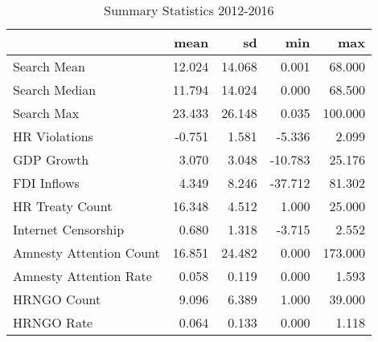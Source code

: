 \begin{table}[ht]
\centering
\begin{tabular}{|l|rrrr|}
  \hline
 & mean & sd & min & max \\ 
  \hline
Search Mean & 12.024 & 14.068 & 0.001 & 68.000 \\ 
  Search Median & 11.794 & 14.024 & 0.000 & 68.500 \\ 
  Search Max & 23.433 & 26.148 & 0.035 & 100.000 \\ 
  HR Violations & -0.751 & 1.581 & -5.336 & 2.099 \\ 
  GDP Growth & 3.070 & 3.048 & -10.783 & 25.176 \\ 
  FDI Inflows & 4.349 & 8.246 & -37.712 & 81.302 \\ 
  HR Treaty Count & 16.348 & 4.512 & 1.000 & 25.000 \\ 
  Internet Censorship & 0.680 & 1.318 & -3.715 & 2.552 \\ 
  Amnesty Attention Count & 16.851 & 24.482 & 0.000 & 173.000 \\ 
  Amnesty Attention Rate & 0.058 & 0.119 & 0.000 & 1.593 \\ 
  HRNGO Count & 9.096 & 6.389 & 1.000 & 39.000 \\ 
  HRNGO Rate & 0.064 & 0.133 & 0.000 & 1.118 \\ 
   \hline
\end{tabular}
\caption{Summary Statistics 2012-2016} 
\end{table}
